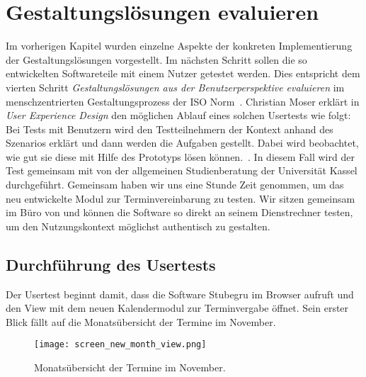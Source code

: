 \chapter{Gestaltungslösungen evaluieren}
\label{chapter:evaluation}

Im vorherigen Kapitel wurden einzelne Aspekte der konkreten Implementierung der
Gestaltungslösungen vorgestellt. Im nächsten Schritt sollen die so entwickelten
Softwareteile mit einem Nutzer getestet werden. Dies entspricht dem vierten
Schritt \textit{Gestaltungslösungen aus der Benutzerperspektive evaluieren} im
menschzentrierten Gestaltungsprozess der ISO Norm~\cite{ISO9241}. Christian
Moser erklärt in \textit{User Experience Design} den möglichen Ablauf eines
solchen Usertests wie folgt: \glqq{}Bei Tests mit Benutzern wird den
Testteilnehmern der Kontext anhand des Szenarios erklärt und dann werden die
Aufgaben gestellt. Dabei wird beobachtet, wie gut sie diese mit Hilfe des
Prototyps lösen können.\grqq{}~\cite{moserTesting}. In diesem Fall wird der Test
gemeinsam mit \ipName von der allgemeinen Studienberatung der Universität
Kassel durchgeführt. Gemeinsam haben wir uns eine Stunde Zeit genommen, um das
neu entwickelte Modul zur Terminvereinbarung zu testen. Wir sitzen gemeinsam im
Büro von \ipName und können die Software so direkt an seinem Dienstrechner
testen, um den Nutzungskontext möglichst authentisch zu gestalten.

\section{Durchführung des Usertests}

Der Usertest beginnt damit, dass \ipName die Software Stubegru im Browser
aufruft und den View mit dem neuen Kalendermodul zur Terminvergabe öffnet. Sein
erster Blick fällt auf die Monatsübersicht der Termine im November.

\begin{figure}[H]
    \caption{Monatsübersicht der Termine im November.}
    \centering
    \texttt{[image: screen\_new\_month\_view.png]}
\end{figure}

